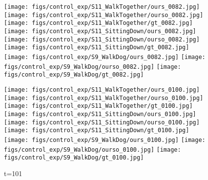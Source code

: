 \documentclass{article}
\begin{document}
\begin{appendix}
\begin{figure*}[!thbp]
\begin{subfigure}{0.12\linewidth}
	    \texttt{[image: figs/control\_exp/S11\_WalkTogether/ours\_0082.jpg]}
	    \texttt{[image: figs/control\_exp/S11\_WalkTogether/ourso\_0082.jpg]}
	    \vspace{.2cm}
  		\texttt{[image: figs/control\_exp/S11\_WalkTogether/gt\_0082.jpg]}
  		\texttt{[image: figs/control\_exp/S11\_SittingDown/ours\_0082.jpg]}
  		\texttt{[image: figs/control\_exp/S11\_SittingDown/ourso\_0082.jpg]}
  		\vspace{.2cm}
  		\texttt{[image: figs/control\_exp/S11\_SittingDown/gt\_0082.jpg]}
  		\texttt{[image: figs/control\_exp/S9\_WalkDog/ours\_0082.jpg]}
  		\texttt{[image: figs/control\_exp/S9\_WalkDog/ourso\_0082.jpg]}
  		\vspace{.2cm}
  		\texttt{[image: figs/control\_exp/S9\_WalkDog/gt\_0082.jpg]}
	\end{subfigure}
	\begin{subfigure}{0.12\linewidth}
        \caption*{t=101}
        \vspace{-7pt}
	    \texttt{[image: figs/control\_exp/S11\_WalkTogether/ours\_0100.jpg]}
	    \texttt{[image: figs/control\_exp/S11\_WalkTogether/ourso\_0100.jpg]}
	    \vspace{.2cm}
  		\texttt{[image: figs/control\_exp/S11\_WalkTogether/gt\_0100.jpg]}
  		\texttt{[image: figs/control\_exp/S11\_SittingDown/ours\_0100.jpg]}
  		\texttt{[image: figs/control\_exp/S11\_SittingDown/ourso\_0100.jpg]}
  		\vspace{.2cm}
  		\texttt{[image: figs/control\_exp/S11\_SittingDown/gt\_0100.jpg]}
  		\texttt{[image: figs/control\_exp/S9\_WalkDog/ours\_0100.jpg]}
  		\texttt{[image: figs/control\_exp/S9\_WalkDog/ourso\_0100.jpg]}
  		\vspace{.2cm}
  		\texttt{[image: figs/control\_exp/S9\_WalkDog/gt\_0100.jpg]}

\end{subfigure}
\end{figure*}
\end{appendix}
\end{document}
